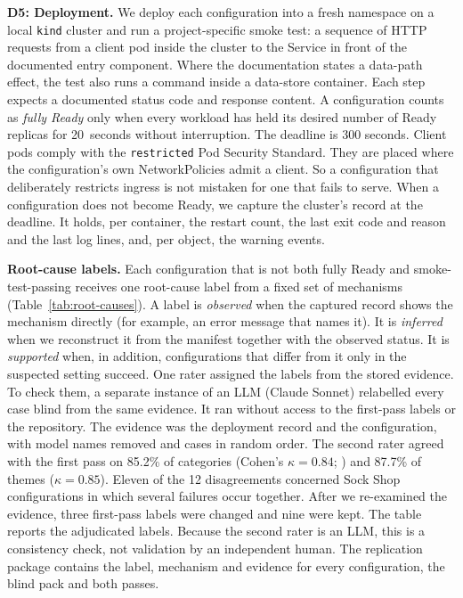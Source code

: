 \textbf{D5: Deployment.} We deploy each configuration into a fresh namespace on a local \texttt{kind} cluster and run a project-specific smoke test: a sequence of HTTP requests from a client pod inside the cluster to the Service in front of the documented entry component. Where the documentation states a data-path effect, the test also runs a command inside a data-store container. Each step expects a documented status code and response content. A configuration counts as \emph{fully Ready} only when every workload has held its desired number of Ready replicas for 20~seconds without interruption. The deadline is 300 seconds. Client pods comply with the \texttt{restricted} Pod Security Standard. They are placed where the configuration's own NetworkPolicies admit a client. So a configuration that deliberately restricts ingress is not mistaken for one that fails to serve. When a configuration does not become Ready, we capture the cluster's record at the deadline. It holds, per container, the restart count, the last exit code and reason and the last log lines, and, per object, the warning events.

\textbf{Root-cause labels.} Each configuration that is not both fully Ready and smoke-test-passing receives one root-cause label from a fixed set of mechanisms (Table~\ref{tab:root-causes}). A label is \emph{observed} when the captured record shows the mechanism directly (for example, an error message that names it). It is \emph{inferred} when we reconstruct it from the manifest together with the observed status. It is \emph{supported} when, in addition, configurations that differ from it only in the suspected setting succeed. One rater assigned the labels from the stored evidence. To check them, a separate instance of an LLM (Claude Sonnet) relabelled every case blind from the same evidence. It ran without access to the first-pass labels or the repository. The evidence was the deployment record and the configuration, with model names removed and cases in random order. The second rater agreed with the first pass on 85.2\% of categories (Cohen's $\kappa=0.84$; \citealp{cohen1960kappa}) and 87.7\% of themes ($\kappa=0.85$). Eleven of the 12 disagreements concerned Sock Shop configurations in which several failures occur together. After we re-examined the evidence, three first-pass labels were changed and nine were kept. The table reports the adjudicated labels. Because the second rater is an LLM, this is a consistency check, not validation by an independent human. The replication package contains the label, mechanism and evidence for every configuration, the blind pack and both passes.

